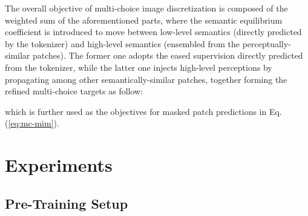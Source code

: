 \documentclass[runningheads]{llncs}
\begin{document}
The overall objective of multi-choice image discretization is composed of the weighted sum of the aforementioned parts, where the semantic equilibrium coefficient  is introduced to move between low-level semantics (directly predicted by the tokenizer) and high-level semantics (ensembled from the perceptually-similar patches).
The former one adopts the eased supervision directly predicted from the tokenizer, while the latter one injects high-level perceptions by propagating among other semantically-similar patches, together forming the refined multi-choice targets  as follow:




which is further used as the objectives for masked patch predictions in Eq. (\ref{eq:mc-mim}).


















































\section{Experiments}




\subsection{Pre-Training Setup}
\end{document}
